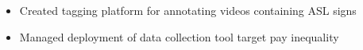 \begin{itemize}
    \setlength\itemsep{0pt}
    \setlength{\parskip}{0pt}
    \item Created tagging platform for annotating videos containing ASL signs
    \item Managed deployment of data collection tool target pay inequality
\end{itemize}
